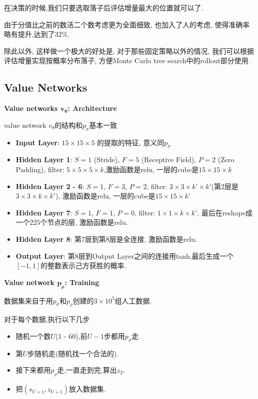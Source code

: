\documentclass[twocolumn]{article}
\begin{document}
在决策的时候,我们只要选取落子后评估增量最大的位置就可以了.

由于分值比之前的数活二个数考虑更为全面细致, 也加入了人的考虑, 使得准确率略有提升,达到了$32\%$.

除此以外, 这样做一个极大的好处是, 对于那些固定策略以外的情况, 我们可以根据评估增量实现按概率分布落子, 方便Monte Carlo tree search中的rollout部分使用.

\subsection{Value Networks}

\noindent \textbf{Value networks $\bm{v_\theta}$: Architecture}

value network $v_\theta$的结构和$p_\sigma$基本一致

\begin{itemize}
	\item \textbf{Input Layer}: $15 \times 15 \times 5$ 的提取的特征, 意义同$p_\sigma$
	\item \textbf{Hidden Layer 1}: $S = 1$ (Stride), $F = 5$ (Receptive Field), $P = 2$ (Zero Padding), filter: $5 \times 5 \times 5 \times k$,激励函数是relu, 一层的cube是$15 \times 15 \times k$
	\item \textbf{Hidden Layer 2 - 6}: $S = 1$, $F = 3$, $P = 2$, filter: $3 \times 3 \times k' \times k'$(第2层是$3 \times 3 \times k \times k'$), 激励函数是relu, 一层的cube是$15 \times 15 \times k'$
	\item \textbf{Hidden Layer 7}: $S = 1$, $F = 1$, $P = 0$, filter: $1 \times 1 \times k \times k'$, 最后在reshape成一个$225$个节点的层, 激励函数是relu. 
	\item \textbf{Hidden Layer 8}: 第7层到第8层是全连接, 激励函数是relu.
	\item \textbf{Output Layer}: 第8层到Output Layer之间的连接用tanh,最后生成一个$[-1,1]$的整数表示己方获胜的概率.
\end{itemize}

\noindent \textbf{Value network $\bm{p_\rho}$: Training}

数据集来自于用$p_\sigma$和$p_\rho$创建的$3 \times 10^5$组人工数据.

对于每个数据,执行以下几步

\begin{itemize}
	\item 随机一个数$U$(1 - 60),前$U-1$步都用$p_\sigma$走. 
	\item 第$U$步随机走(随机找一个合法的). 
	\item 接下来都用$p_\rho$走,一直走到完,算出$z_T$.
	\item 把$(s_{U+1}, z_{U+1})$放入数据集. 
\end{itemize}
\end{document}
